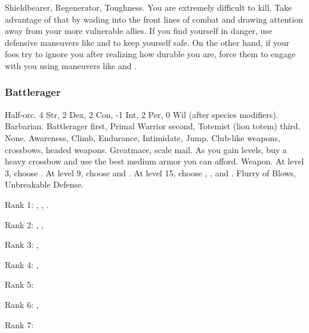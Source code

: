              Shieldbearer, Regenerator, Toughness.
             You are extremely difficult to kill.
            Take advantage of that by wading into the front lines of combat and drawing attention away from your more vulnerable allies.
            If you find yourself in danger, use defensive maneuvers like  and  to keep yourself safe.
            On the other hand, if your foes try to ignore you after realizing how durable you are, force them to engage with you using maneuvers like  and .

        \subsubsection{Battlerager}
             Half-orc.
             4 Str, 2 Dex, 2 Con, -1 Int, 2 Per, 0 Wil (after species modifiers).
             Barbarian.
             Battlerager first, Primal Warrior second, Totemist (lion totem) third.
             None.
             Awareness, Climb, Endurance, Intimidate, Jump.
             Club-like weapons, crossbows, headed weapons.
             Greatmace, scale mail. As you gain levels, buy a heavy crossbow and use the best medium armor you can afford.
             Weapon.
                At level 3, choose .
                At level 9, choose  and .
                At level 15, choose , , and .
             Flurry of Blows, Unbreakable Defense.
            \begin{raggeditemize}
                \item Rank 1: , , .
                \item Rank 2: , , 
                \item Rank 3: , 
                \item Rank 4: , 
                \item Rank 5: 
                \item Rank 6: , 
                \item Rank 7: 
            \end{raggeditemize}
